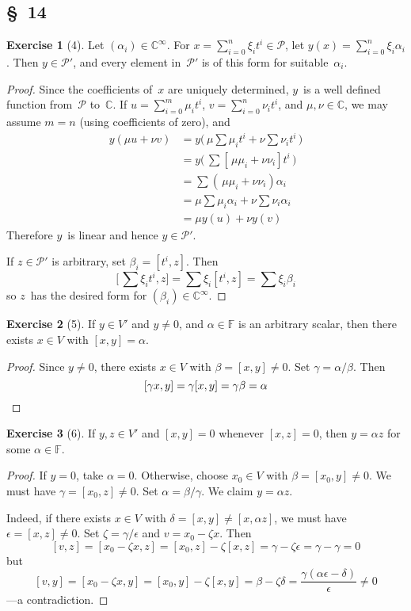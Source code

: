\documentclass[letterpaper,12pt]{article}
\newcommand{\F}{\mathbb{F}}
\newcommand{\C}{\mathbb{C}}
\renewcommand{\P}{\mathcal{P}}
\theoremstyle{definition}
\newtheorem*{exer}{Exercise}
\theoremstyle{remark}
\theoremstyle{direction}
\begin{document}
\subsection*{\S~14}
\begin{exer}[4]
Let \((\alpha_i)\in\C^{\infty}\). For \(x=\sum_{i=0}^n\xi_i t^i\in\P\), let \(y(x)=\sum_{i=0}^n\xi_i\alpha_i\). Then \(y\in\P'\), and every element in~\(\P'\) is of this form for suitable~\(\alpha_i\).
\end{exer}
\begin{proof}
Since the coefficients of~\(x\) are uniquely determined, \(y\)~is a well defined function from~\(\P\) to~\(\C\). If \(u=\sum_{i=0}^m\mu_i t^i\), \(v=\sum_{i=0}^n\nu_i t^i\), and \(\mu,\nu\in\C\), we may assume \(m=n\) (using coefficients of zero), and
\begin{align*}
y(\mu u+\nu v)&=y\bigl(\,\mu\sum\mu_i t^i+\nu\sum\nu_i t^i\,\bigr)\\
	&=y\bigl(\,\sum[\,\mu\mu_i+\nu\nu_i]t^i\,\bigr)\\
	&=\sum(\,\mu\mu_i+\nu\nu_i)\alpha_i\\
	&=\mu\sum\mu_i\alpha_i+\nu\sum\nu_i\alpha_i\\
	&=\mu y(u)+\nu y(v)
\end{align*}
Therefore \(y\)~is linear and hence \(y\in\P'\).

If \(z\in\P'\) is arbitrary, set \(\beta_i=[t^i,z]\). Then
\[\bigl[\,\sum\xi_i t^i,z\bigr]=\sum\xi_i[t^i,z]=\sum\xi_i\beta_i\]
so \(z\)~has the desired form for \((\beta_i)\in\C^{\infty}\).
\end{proof}

\begin{exer}[5]
If \(y\in V'\) and \(y\ne0\), and \(\alpha\in\F\) is an arbitrary scalar, then there exists \(x\in V\) with \([x,y]=\alpha\).
\end{exer}
\begin{proof}
Since \(y\ne0\), there exists \(x\in V\) with \(\beta=[x,y]\ne0\). Set \(\gamma=\alpha/\beta\). Then
\[[\gamma x,y]=\gamma[x,y]=\gamma\beta=\alpha\qedhere\]
\end{proof}

\begin{exer}[6]
If \(y,z\in V'\) and \([x,y]=0\) whenever \([x,z]=0\), then \(y=\alpha z\) for some \(\alpha\in\F\).
\end{exer}
\begin{proof}
If \(y=0\), take \(\alpha=0\). Otherwise, choose \(x_0\in V\) with \(\beta=[x_0,y]\ne0\). We must have \(\gamma=[x_0,z]\ne0\). Set \(\alpha=\beta/\gamma\). We claim \(y=\alpha z\).

Indeed, if there exists \(x\in V\) with \(\delta=[x,y]\ne[x,\alpha z]\), we must have \(\epsilon=[x,z]\ne0\). Set \(\zeta=\gamma/\epsilon\) and \(v=x_0-\zeta x\). Then
\[[v,z]=[x_0-\zeta x,z]=[x_0,z]-\zeta[x,z]=\gamma-\zeta\epsilon=\gamma-\gamma=0\]
but
\[[v,y]=[x_0-\zeta x,y]=[x_0,y]-\zeta[x,y]=\beta-\zeta\delta=\frac{\gamma(\alpha\epsilon-\delta)}{\epsilon}\ne0\]
---a contradiction.
\end{proof}
\end{document}
